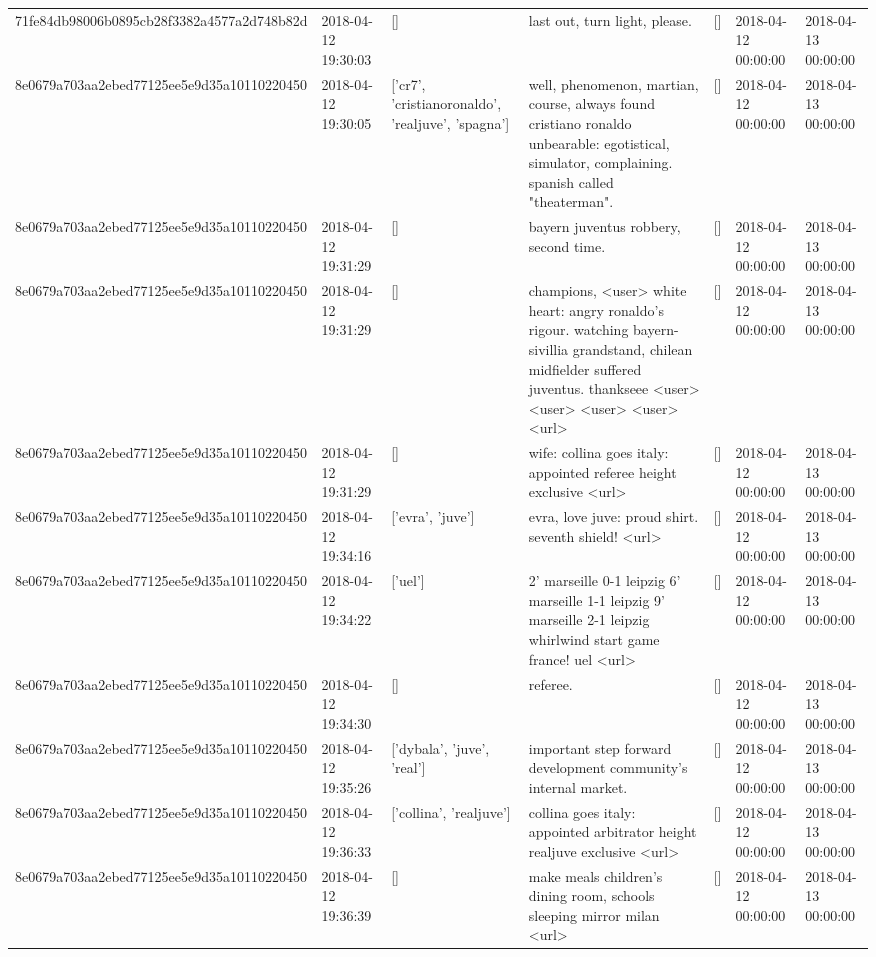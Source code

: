 \begin{tabular}{lllllll}
71fe84db98006b0895cb28f3382a4577a2d748b82d & 2018-04-12 19:30:03 & [] & last out, turn light, please. & [] & 2018-04-12 00:00:00 & 2018-04-13 00:00:00 \\
8e0679a703aa2ebed77125ee5e9d35a10110220450 & 2018-04-12 19:30:05 & ['cr7', 'cristianoronaldo', 'realjuve', 'spagna'] & well, phenomenon, martian, course, always found cristiano ronaldo unbearable: egotistical, simulator, complaining. spanish called "theaterman". & [] & 2018-04-12 00:00:00 & 2018-04-13 00:00:00 \\
8e0679a703aa2ebed77125ee5e9d35a10110220450 & 2018-04-12 19:31:29 & [] & bayern juventus robbery, second time. & [] & 2018-04-12 00:00:00 & 2018-04-13 00:00:00 \\
8e0679a703aa2ebed77125ee5e9d35a10110220450 & 2018-04-12 19:31:29 & [] & champions, <user> white heart: angry ronaldo's rigour. watching bayern-sivillia grandstand, chilean midfielder suffered juventus. thankseee <user> <user> <user> <user> <url> & [] & 2018-04-12 00:00:00 & 2018-04-13 00:00:00 \\
8e0679a703aa2ebed77125ee5e9d35a10110220450 & 2018-04-12 19:31:29 & [] & wife: collina goes italy: appointed referee height exclusive <url> & [] & 2018-04-12 00:00:00 & 2018-04-13 00:00:00 \\
8e0679a703aa2ebed77125ee5e9d35a10110220450 & 2018-04-12 19:34:16 & ['evra', 'juve'] & evra, love juve: proud shirt. seventh shield! <url> & [] & 2018-04-12 00:00:00 & 2018-04-13 00:00:00 \\
8e0679a703aa2ebed77125ee5e9d35a10110220450 & 2018-04-12 19:34:22 & ['uel'] & 2' marseille 0-1 leipzig 6' marseille 1-1 leipzig 9' marseille 2-1 leipzig whirlwind start game france! uel <url> & [] & 2018-04-12 00:00:00 & 2018-04-13 00:00:00 \\
8e0679a703aa2ebed77125ee5e9d35a10110220450 & 2018-04-12 19:34:30 & [] & referee. & [] & 2018-04-12 00:00:00 & 2018-04-13 00:00:00 \\
8e0679a703aa2ebed77125ee5e9d35a10110220450 & 2018-04-12 19:35:26 & ['dybala', 'juve', 'real'] & important step forward development community's internal market. & [] & 2018-04-12 00:00:00 & 2018-04-13 00:00:00 \\
8e0679a703aa2ebed77125ee5e9d35a10110220450 & 2018-04-12 19:36:33 & ['collina', 'realjuve'] & collina goes italy: appointed arbitrator height realjuve exclusive <url> & [] & 2018-04-12 00:00:00 & 2018-04-13 00:00:00 \\
8e0679a703aa2ebed77125ee5e9d35a10110220450 & 2018-04-12 19:36:39 & [] & make meals children's dining room, schools sleeping mirror milan <url> & [] & 2018-04-12 00:00:00 & 2018-04-13 00:00:00 \\

\end{tabular}
